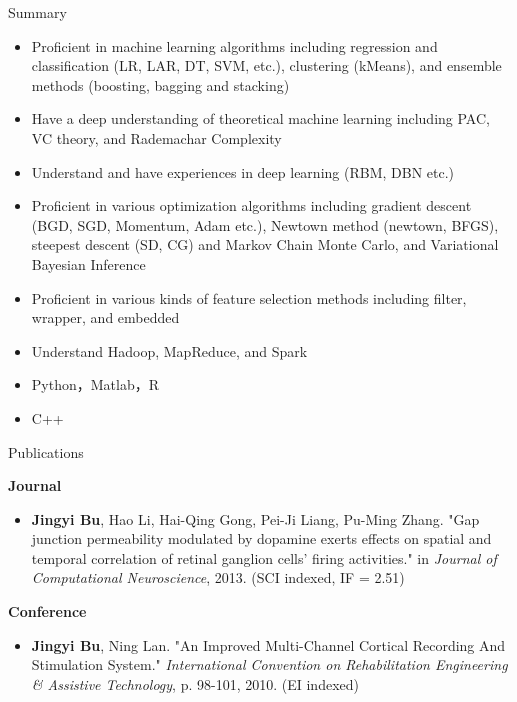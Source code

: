 \documentclass{resume} %
\begin{document}
\begin{rSection}{Summary}

\begin{itemize}
	\item Proficient in machine learning algorithms including regression and classification (LR, LAR, DT, SVM, etc.), clustering (kMeans), and ensemble methods (boosting, bagging and stacking)
	\item Have a deep understanding of theoretical machine learning including PAC, VC theory, and Rademachar Complexity
	\item Understand and have experiences in deep learning (RBM, DBN etc.)
	\item Proficient in various optimization algorithms including gradient descent (BGD, SGD, Momentum, Adam etc.), Newtown method (newtown, BFGS), steepest descent (SD, CG) and Markov Chain Monte Carlo, and Variational Bayesian Inference
	\item Proficient in various kinds of feature selection methods including filter, wrapper, and embedded
	\item Understand Hadoop, MapReduce, and Spark
	\item Python，Matlab，R
	\item C++
\end{itemize}

\end{rSection}


\begin{rSection}{Publications}

{\bf Journal}
\begin{itemize}\small
\item {\bf Jingyi Bu}, Hao Li, Hai-Qing Gong, Pei-Ji Liang, Pu-Ming Zhang. "Gap junction permeability modulated by dopamine exerts effects on spatial and temporal correlation of retinal ganglion cells’ firing activities." in {\em Journal of Computational Neuroscience}, 2013. (SCI indexed, IF = 2.51) 
\end{itemize}


{\bf Conference}
\begin{itemize}\small
\item {\bf Jingyi Bu}, Ning Lan.  "An Improved Multi-Channel Cortical Recording And Stimulation System." {\em International Convention on Rehabilitation Engineering \& Assistive Technology}, p. 98-101, 2010. (EI indexed)
\end{itemize}

\end{rSection}
\end{document}

